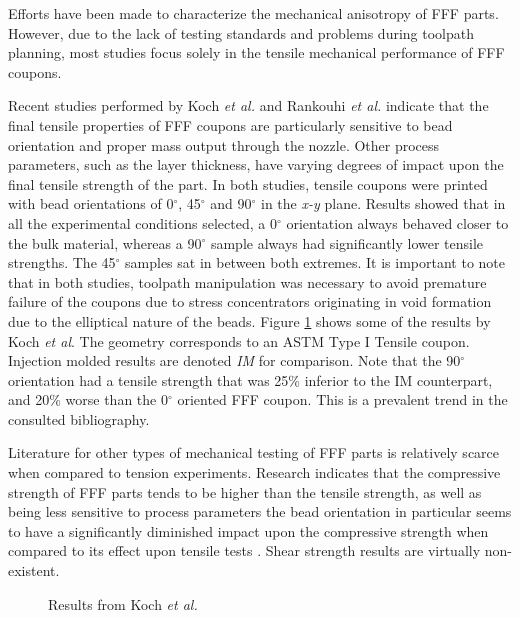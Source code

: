 \documentclass[main.tex]{subfiles}
\begin{document}
Efforts have been made to characterize the mechanical anisotropy of FFF parts. However, due to the lack of testing standards and problems during toolpath planning, most studies focus solely in the tensile mechanical performance of FFF coupons.

Recent studies performed by Koch \emph{et al.} \cite{Koch2017} and Rankouhi \emph{et al.} \cite{Rankouhi2016} indicate that the final tensile properties of FFF coupons are particularly sensitive to bead orientation and proper mass output through the nozzle. Other process parameters, such as the layer thickness, have varying degrees of impact upon the final tensile strength of the part. In both studies, tensile coupons were printed with bead orientations of 0$^\circ$, 45$^\circ$ and 90$^\circ$ in the \emph{x-y} plane. Results showed that in all the experimental conditions selected, a 0$^\circ$ orientation always behaved closer to the bulk material, whereas a 90$^\circ$ sample always had significantly lower tensile strengths. The 45$^\circ$ samples sat in between both extremes. It is important to note that in both studies, toolpath manipulation was necessary to avoid premature failure of the coupons due to stress concentrators originating in void formation due to the elliptical nature of the beads. Figure \ref{fig:FFFmechProp} shows some of the results by Koch \emph{et al}. The geometry corresponds to an ASTM Type I Tensile coupon. Injection molded results are denoted \emph{IM} for comparison. Note that the 90$^\circ$ orientation had a tensile strength that was 25\% inferior to the IM counterpart, and 20\% worse than the 0$^\circ$ oriented FFF coupon. This is a prevalent trend in the consulted bibliography.

Literature for other types of mechanical testing of FFF parts is relatively scarce when compared to tension experiments. Research indicates that the compressive strength of FFF parts tends to be higher than the tensile strength, as well as being less sensitive to process parameters \textemdash the bead orientation in particular seems to have a significantly diminished impact upon the compressive strength when compared to its effect upon tensile tests \cite{Ahn2002,Lee2007}. Shear strength results are virtually non-existent.

\pagebreak
\begin{figure}[h]
	\center
	\hfill
	\caption{Results from Koch \emph{et al.} \cite{Koch2017}} \label{fig:FFFmechProp}
\end{figure}
\end{document}

